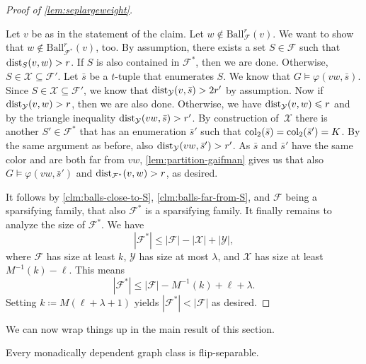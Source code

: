 \documentclass[a4paper,UKenglish,cleveref, autoref, thm-restate]{lipics-v2021}
\newcommand{\XX}{\mathcal{X}}
\newcommand{\YY}{\mathcal{Y}}
\newcommand{\col}{\textnormal{col}}
\newcommand{\dist}{\textnormal{dist}}
\renewcommand{\phi}{\varphi}
\newcommand{\FF}{\mathcal{F}}
\renewcommand{\le}{\leqslant}
\renewcommand{\leq}{\le}
\newcommand{\Ball}{\mathrm{Ball}}
\begin{document}
\begin{proof}[Proof of \cref{lem:seplargeweight}]
\begin{claimproof}
    Let $v$ be as in the statement of the claim.
Let $w \notin \Ball^r_{\FF}(v)$. 
    We want to show that $w \notin \Ball^r_{\FF^*}(v)$, too.
    By assumption, there exists a set $S \in \FF$ such that $\dist_S(v,w) > r$.
    If $S$ is also contained in $\FF^*$, then we are done.
    Otherwise, $S \in \XX \subseteq \FF'$.
    Let $\bar s$ be a $t$-tuple that enumerates $S$.
    We know that $G \models \phi(vw,\bar s)$.
    Since $S \in \XX \subseteq \FF'$, we know that $\dist_\YY(v, \bar s) > 2r'$ by assumption.
    Now if $\dist_\YY(v,w) > r$, then we are also done.
    Otherwise, we have $\dist_\YY(v,w) \leq r$ and by the triangle inequality $\dist_\YY(vw, \bar s) > r'$.
    By construction of~$\XX$ there is another $S' \in \FF^*$ that has an enumeration $\bar s'$ such that $\col_2(\bar s) = \col_2(\bar s') = K$.
    By the same argument as before, also $\dist_\YY(vw, \bar s') > r'$.
    As $\bar s$ and $\bar s'$ have the same color and are both far from $vw$, \cref{lem:partition-gaifman} gives us that also $G \models \phi(vw,\bar s')$ and $\dist_{\FF^*}(v,w) > r$, as desired. 
\end{claimproof}
It follows by \cref{clm:balls-close-to-S}, \cref{clm:balls-far-from-S}, and $\FF$ being a sparsifying family, that also $\FF^*$ is a sparsifying family.
It finally remains to analyze the size of $\FF^*$.
We have 
\[
    |\FF^*| \leq |\FF| - |\XX| + |\YY|,
\]
where $\FF$ has size at least $k$, $\YY$ has size at most $\lambda$, and $\XX$ has size at least $M^{-1}(k) - \ell$.
This means 
\[
    |\FF^*| \leq |\FF| - M^{-1}(k) + \ell + \lambda.
\]
Setting $k \coloneqq M(\ell + \lambda + 1)$ yields $|\FF^*| < |\FF|$ as desired.
\end{proof}

We can now wrap things up in the main result of this section.

\begin{lemma}\label{lem:nip-implies-sep}
   Every monadically dependent graph class is flip-separable.
\end{lemma}
\end{document}
